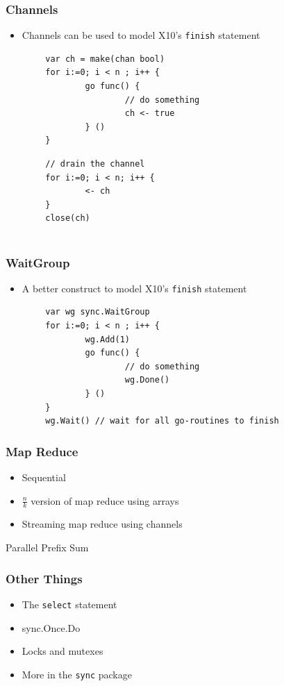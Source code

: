 \documentclass{beamer}
\begin{document}
\begin{frame}[fragile]
\frametitle{Channels}
\begin{itemize}
\item Channels can be used to model X10's \verb=finish= statement
\end{itemize}
\begin{verbatim}
        var ch = make(chan bool)
        for i:=0; i < n ; i++ {
                go func() { 
                        // do something
                        ch <- true
                } ()
        }
\end{verbatim}
\pause
\begin{verbatim}
        // drain the channel
        for i:=0; i < n; i++ {
                <- ch
        }
        close(ch)
        
\end{verbatim}
\end{frame}


\begin{frame} [fragile]
\frametitle{WaitGroup}
\begin{itemize}
\item A better construct to model X10's \verb=finish= statement
\end{itemize}
\begin{verbatim}
        var wg sync.WaitGroup
        for i:=0; i < n ; i++ {
                wg.Add(1)
                go func() { 
                        // do something
                        wg.Done()
                } ()                
        }
        wg.Wait() // wait for all go-routines to finish
\end{verbatim}


\end{frame}

\begin{frame}[fragile] 
\frametitle{Map Reduce}
\begin{itemize}
  \item Sequential
  \item $\frac{n}{k}$ version of map reduce using arrays
  \item Streaming map reduce using channels
\end{itemize}
\end{frame}

\begin{frame} {Parallel Prefix Sum}
\end{frame}

\begin{frame} [fragile]
\frametitle{Other Things}
\begin{itemize}
\item The \verb=select= statement
\item sync.Once.Do
\item Locks and mutexes
\item More in the \verb=sync= package
\end{itemize}
\end{frame}
\end{document}
